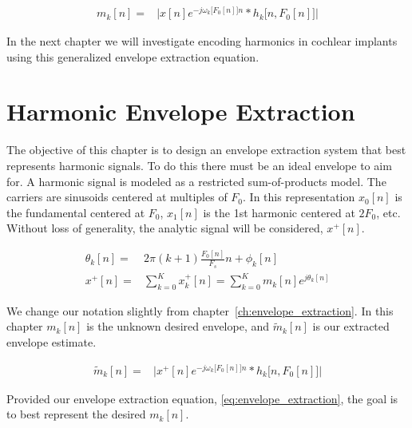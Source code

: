 \documentclass [11pt, proquest,oneside] {ganter_thesis}[2015/03/03]
\begin{document}
\begin{align}
\label{eq:envelope_extraction_general}
m_k[n] =& \Big| x[n]e^{-j \omega_k\big[F_0[n]\big]n} * h_k\big[n,F_0[n]\big]  \Big|
\end{align}

In the next chapter we will investigate encoding harmonics in cochlear implants using this generalized envelope extraction equation.





\chapter{Harmonic Envelope Extraction}\label{ch:harmonic_envelopes}

The objective of this chapter is to design an envelope extraction system that best represents harmonic signals.  To do this there must be an ideal envelope to aim for.  A harmonic signal is modeled as  a restricted sum-of-products model.  The carriers are sinusoids centered at multiples of $F_0$. In this representation $x_0[n]$ is the fundamental centered at $F_0$, $x_1[n]$ is the 1st harmonic centered at $2F_0$, etc.  Without loss of generality, the analytic signal will be considered, $x^+[n]$.

\begin{align}
\theta_k[n] =& 2\pi(k+1)\frac{F_0[n]}{F_s}n + \phi_k[n] \\
\label{eq:harmonic_SOP}
x^+[n] =& \sum\limits_{k=0}^K x_k^+[n] = \sum\limits_{k=0}^K m_k[n] e^{j\theta_k[n]}
\end{align}

We change our notation slightly from chapter~\ref{ch:envelope_extraction}.  In this chapter $m_k[n]$ is the unknown desired envelope, and $\tilde{m}_k[n]$ is our extracted envelope estimate.

\begin{align}
\label{eq:envelope_extraction}
\tilde{m}_k[n] =& \Big| x^+[n]e^{-j \omega_k\big[F_0[n]\big]n} * h_k\big[n,F_0[n]\big]  \Big|
\end{align}

Provided our envelope extraction equation, \ref{eq:envelope_extraction}, the goal is to best represent the desired $m_k[n]$.
\end{document}
